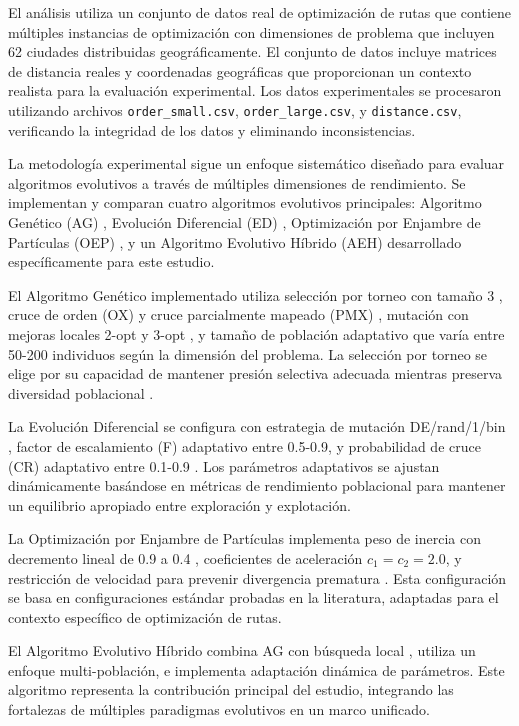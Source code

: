 \documentclass[12pt,a4paper]{article}
\begin{document}
El análisis utiliza un conjunto de datos real de optimización de rutas que contiene múltiples instancias de optimización con dimensiones de problema que incluyen 62 ciudades distribuidas geográficamente. El conjunto de datos incluye matrices de distancia reales y coordenadas geográficas que proporcionan un contexto realista para la evaluación experimental. Los datos experimentales se procesaron utilizando archivos \texttt{order\_small.csv}, \texttt{order\_large.csv}, y \texttt{distance.csv}, verificando la integridad de los datos y eliminando inconsistencias.

La metodología experimental sigue un enfoque sistemático diseñado para evaluar algoritmos evolutivos a través de múltiples dimensiones de rendimiento. Se implementan y comparan cuatro algoritmos evolutivos principales: Algoritmo Genético (AG) \cite{goldberg1989}, Evolución Diferencial (ED) \cite{storn1997}, Optimización por Enjambre de Partículas (OEP) \cite{eberhart1995}, y un Algoritmo Evolutivo Híbrido (AEH) desarrollado específicamente para este estudio.

El Algoritmo Genético implementado utiliza selección por torneo con tamaño 3 \cite{baker1985}, cruce de orden (OX) y cruce parcialmente mapeado (PMX) \cite{oliver1987}, mutación con mejoras locales 2-opt y 3-opt \cite{lin1973,croes1958}, y tamaño de población adaptativo que varía entre 50-200 individuos según la dimensión del problema. La selección por torneo se elige por su capacidad de mantener presión selectiva adecuada mientras preserva diversidad poblacional \cite{whitley1989}.

La Evolución Diferencial se configura con estrategia de mutación DE/rand/1/bin \cite{price2013}, factor de escalamiento (F) adaptativo entre 0.5-0.9, y probabilidad de cruce (CR) adaptativo entre 0.1-0.9 \cite{das2011}. Los parámetros adaptativos se ajustan dinámicamente basándose en métricas de rendimiento poblacional para mantener un equilibrio apropiado entre exploración y explotación.

La Optimización por Enjambre de Partículas implementa peso de inercia con decremento lineal de 0.9 a 0.4 \cite{shi1998}, coeficientes de aceleración $c_1=c_2=2.0$, y restricción de velocidad para prevenir divergencia prematura \cite{van2013}. Esta configuración se basa en configuraciones estándar probadas en la literatura, adaptadas para el contexto específico de optimización de rutas.

El Algoritmo Evolutivo Híbrido combina AG con búsqueda local \cite{voudouris2003,hansen2003}, utiliza un enfoque multi-población, e implementa adaptación dinámica de parámetros. Este algoritmo representa la contribución principal del estudio, integrando las fortalezas de múltiples paradigmas evolutivos en un marco unificado.
\end{document}

